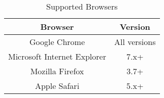 \documentclass{article}
\begin{document}
\begin{table}
    \centering
    \begin{tabular}{|c|c|}\hline
        Browser & Version \\\hline\hline
        Google Chrome & All versions  \\\hline
        Microsoft Internet Explorer & 7.x+ \\\hline
        Mozilla Firefox & 3.7+ \\\hline
        Apple Safari & 5.x+ \\\hline
    \end{tabular}
    \caption{Supported Browsers}
    \label{browsers}
\end{table}
\end{document}
